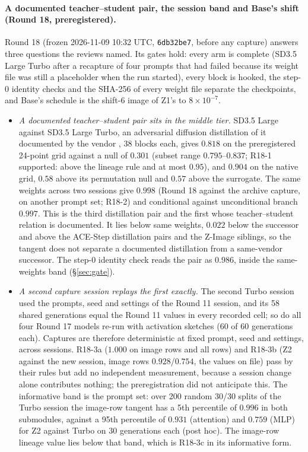 \documentclass[11pt]{article}
\begin{document}
\paragraph{A documented teacher--student pair, the session band and Base's shift (Round 18, preregistered).} Round 18 (frozen 2026-11-09 10:32 UTC, \texttt{6db32be7}, before any capture) answers three questions the reviews named. Its gates hold: every arm is complete (SD3.5 Large Turbo after a recapture of four prompts that had failed because its weight file was still a placeholder when the run started), every block is hooked, the step-0 identity checks and the SHA-256 of every weight file separate the checkpoints, and Base's schedule is the shift-6 image of Z1's to $8\times10^{-7}$.
\begin{itemize}
 \item \emph{A documented teacher--student pair sits in the middle tier.} SD3.5 Large against SD3.5 Large Turbo, an adversarial diffusion distillation of it documented by the vendor \citep{sauer2024adversarial}, 38 blocks each, gives $0.818$ on the preregistered 24-point grid against a null of $0.301$ (subset range $0.795$--$0.837$; R18-1 supported: above the lineage rule and at most $0.95$), and $0.904$ on the native grid, $0.58$ above its permutation null and $0.57$ above the surrogate. The same weights across two sessions give $0.998$ (Round 18 against the archive capture, on another prompt set; R18-2) and conditional against unconditional branch $0.997$. This is the third distillation pair and the first whose teacher--student relation is documented. It lies below same weights, $0.022$ below the successor and above the ACE-Step distillation pairs and the Z-Image siblings, so the tangent does not separate a documented distillation from a same-vendor successor. The step-0 identity check reads the pair as $0.986$, inside the same-weights band (\S\ref{sec:gate}).
 \item \emph{A second capture session replays the first exactly.} The second Turbo session used the prompts, seed and settings of the Round 11 session, and its 58 shared generations equal the Round 11 values in every recorded cell; so do all four Round 17 models re-run with activation sketches (60 of 60 generations each). Captures are therefore deterministic at fixed prompt, seed and settings, across sessions. R18-3a ($1.000$ on image rows and all rows) and R18-3b (Z2 against the new session, image rows $0.928$/$0.754$, the values on file) pass by their rules but add no independent measurement, because a session change alone contributes nothing; the preregistration did not anticipate this. The informative band is the prompt set: over 200 random 30/30 splits of the Turbo session the image-row tangent has a 5th percentile of $0.996$ in both submodules, against a 95th percentile of $0.931$ (attention) and $0.759$ (MLP) for Z2 against Turbo on 30 generations each (post hoc). The image-row lineage value lies below that band, which is R18-3c in its informative form.

\end{itemize}
\end{document}
